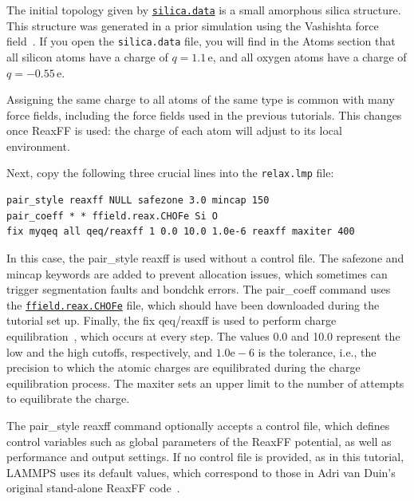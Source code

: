 \documentclass[9pt,tutorial]{livecoms}
\newcommand{\lmpcmd}[1]{\hspace{0pt}\colorbox{listing}{\textcolor{command}{\small{#1}}}\hspace{0pt}} %
\newcommand{\flecmd}[1]{\textcolor{command}{\texttt{#1}}} %
\newcommand{\dwlcmd}[1]{\textcolor{download}{\texttt{#1}}} %
\newcommand{\filepath}{https://raw.githubusercontent.com/lammpstutorials/lammpstutorials-article/main/files/}
\begin{document}
The initial topology given by \href{\filepath tutorial5/silica.data}{\dwlcmd{silica.data}}
is a small amorphous silica structure.  {\color{blue}This structure was generated in a prior
simulation using the Vashishta force field~\cite{vashishta1990interaction}.}
If you open the \flecmd{silica.data} file, you will find in the \lmpcmd{Atoms}
section that all silicon atoms have a charge of $q = 1.1\,\text{e}$, and all oxygen
atoms have a charge of $q = -0.55\,\text{e}$.

\begin{note}
Assigning the same charge to all atoms of the same type is common with many
force fields, including the force fields used in the previous tutorials.  This
changes once ReaxFF is used: the charge of each atom will adjust to its local
environment.
\end{note}

Next, copy the following three crucial lines into the \flecmd{relax.lmp} file:
\begin{lstlisting}
pair_style reaxff NULL safezone 3.0 mincap 150
pair_coeff * * ffield.reax.CHOFe Si O
fix myqeq all qeq/reaxff 1 0.0 10.0 1.0e-6 reaxff maxiter 400
\end{lstlisting}
In this case, the \lmpcmd{pair\_style reaxff} is used without a control file.  The
\lmpcmd{safezone} and \lmpcmd{mincap} keywords are added to prevent
allocation issues, which sometimes can trigger segmentation faults and
\lmpcmd{bondchk} errors.  The \lmpcmd{pair\_coeff} command uses the
\href{\filepath tutorial5/ffield.reax.CHOFe}{\dwlcmd{ffield.reax.CHOFe}}
file, which should have been downloaded during the tutorial set up.  Finally, the
\lmpcmd{fix qeq/reaxff} is used to perform charge equilibration~\cite{rappe1991charge},
which occurs at every step.  The values 0.0 and 10.0 represent the
low and the high cutoffs, respectively, and $1.0 \text{e} -6$ is the
{\color{blue}tolerance, i.e., the precision to which the atomic charges are
equilibrated during the charge equilibration process.}
The \lmpcmd{maxiter} sets an upper limit to the number of attempts to
equilibrate the charge.

\begin{note}
{\color{blue}
The \lmpcmd{pair\_style reaxff} command optionally accepts a control file,
which defines control variables such as
global parameters of the ReaxFF potential, as well as performance and output settings. 
If no control file is provided, as in this tutorial, LAMMPS uses its default values,
which correspond to those in Adri van Duin's original stand-alone ReaxFF code~\cite{van2001reaxff}.}
\end{note}
\end{document}
